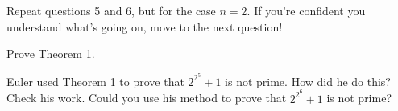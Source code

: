 \documentclass[handout,nooutcomes]{ximera}
\begin{document}
\begin{question}
Repeat questions 5 and 6, but for the case $n=2$.  If you're confident you understand what's going on, move to the next question!
\end{question}

\begin{question}
Prove Theorem 1.
\end{question}

\begin{question}
Euler used Theorem 1 to prove that $2^{2^5}+1$ is not prime.  How did he do this?  Check his work.  Could you use his method to prove that $2^{2^6} +1$ is not prime?
\end{question}
\end{document}
